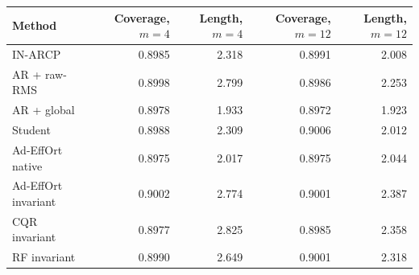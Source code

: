 \begin{tabular}{lrrrr}
\toprule
Method & Coverage, $m=4$ & Length, $m=4$ & Coverage, $m=12$ & Length, $m=12$ \\
\midrule
IN-ARCP & 0.8985 & 2.318 & 0.8991 & 2.008 \\
AR + raw-RMS & 0.8998 & 2.799 & 0.8986 & 2.253 \\
AR + global & 0.8978 & 1.933 & 0.8972 & 1.923 \\
Student & 0.8988 & 2.309 & 0.9006 & 2.012 \\
Ad-EffOrt native & 0.8975 & 2.017 & 0.8975 & 2.044 \\
Ad-EffOrt invariant & 0.9002 & 2.774 & 0.9001 & 2.387 \\
CQR invariant & 0.8977 & 2.825 & 0.8985 & 2.358 \\
RF invariant & 0.8990 & 2.649 & 0.9001 & 2.318 \\
\bottomrule
\end{tabular}
